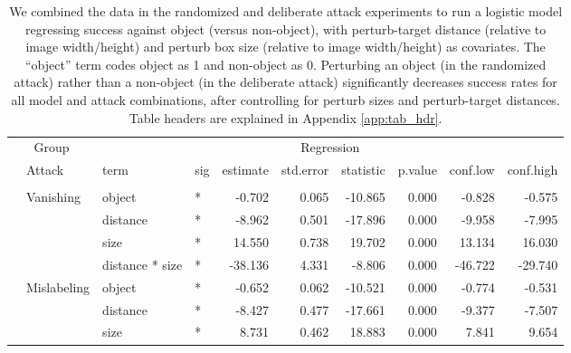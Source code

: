 \begingroup\fontsize{9}{11}\selectfont

\begin{longtable}[t]{llllrrrrrr}
\caption{\label{tab:rand_arb_compare_table}We combined the data in the randomized and deliberate attack experiments to run a logistic model regressing success against object (versus non-object), with perturb-target distance (relative to image width/height) and perturb box size (relative to image width/height) as covariates. The ``object'' term codes object as 1 and non-object as 0. Perturbing an object (in the randomized attack) rather than a non-object (in the deliberate attack) significantly decreases success rates for all model and attack combinations, after controlling for perturb sizes and perturb-target distances. Table headers are explained in Appendix \ref{app:tab_hdr}.}\\
\toprule
\multicolumn{2}{c}{Group} & \multicolumn{8}{c}{Regression} \\
\cmidrule(l{3pt}r{3pt}){1-2} \cmidrule(l{3pt}r{3pt}){3-10}
 & Attack & term & sig & estimate & std.error & statistic & p.value & conf.low & conf.high\\
\midrule
\addlinespace[0.3em]
\multicolumn{10}{l}{\textbf{YOLOv3}}\\
\hspace{1em} & Vanishing & object & * & -0.702 & 0.065 & -10.865 & 0.000 & -0.828 & -0.575\\
\cmidrule{3-10}\nopagebreak
\hspace{1em} &  & distance & * & -8.962 & 0.501 & -17.896 & 0.000 & -9.958 & -7.995\\
\cmidrule{3-10}\nopagebreak
\hspace{1em} &  & size & * & 14.550 & 0.738 & 19.702 & 0.000 & 13.134 & 16.030\\
\cmidrule{3-10}\nopagebreak
\hspace{1em} &  & distance * size & * & -38.136 & 4.331 & -8.806 & 0.000 & -46.722 & -29.740\\
\cmidrule{2-10}\nopagebreak
\hspace{1em} & Mislabeling & object & * & -0.652 & 0.062 & -10.521 & 0.000 & -0.774 & -0.531\\
\cmidrule{3-10}\nopagebreak
\hspace{1em} &  & distance & * & -8.427 & 0.477 & -17.661 & 0.000 & -9.377 & -7.507\\
\cmidrule{3-10}\nopagebreak
\hspace{1em} &  & size & * & 8.731 & 0.462 & 18.883 & 0.000 & 7.841 & 9.654\\

\end{longtable}
